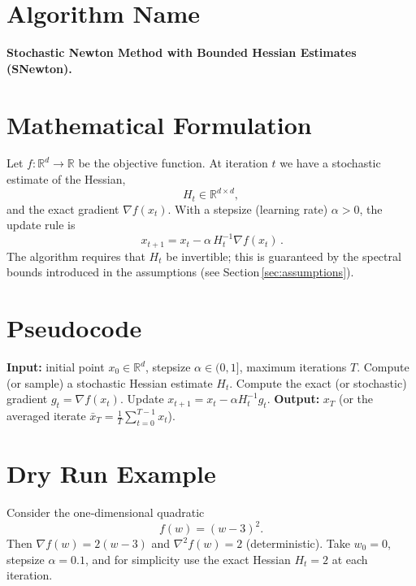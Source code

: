\documentclass{article}
\begin{document}
\section*{Algorithm Name}
\textbf{Stochastic Newton Method with Bounded Hessian Estimates (SNewton).}

\section*{Mathematical Formulation}
Let $f:\mathbb{R}^{d}\rightarrow\mathbb{R}$ be the objective function.  
At iteration $t$ we have a stochastic estimate of the Hessian,
\[
H_{t}\in\mathbb{R}^{d\times d},
\]
and the exact gradient $\nabla f(x_{t})$.  
With a stepsize (learning rate) $\alpha>0$, the update rule is
\begin{equation}
\boxed{\,x_{t+1}=x_{t}-\alpha\,H_{t}^{-1}\nabla f(x_{t})\,}. \tag{1}
\end{equation}
The algorithm requires that $H_{t}$ be invertible; this is guaranteed by the
spectral bounds introduced in the assumptions (see Section \ref{sec:assumptions}).

\section*{Pseudocode}
\begin{algorithm}[H]
\caption{Stochastic Newton (SNewton)}\label{alg:snewton}
\begin{algorithmic}[1]
\STATE \textbf{Input:} initial point $x_{0}\in\mathbb{R}^{d}$, stepsize $\alpha\in(0,1]$, 
maximum iterations $T$.
    \STATE Compute (or sample) a stochastic Hessian estimate $H_{t}$.
    \STATE Compute the exact (or stochastic) gradient $g_{t}=\nabla f(x_{t})$.
    \STATE Update $x_{t+1}=x_{t}-\alpha H_{t}^{-1}g_{t}$.
\ENDFOR
\STATE \textbf{Output:} $x_{T}$ (or the averaged iterate $\bar x_{T}=\frac1T\sum_{t=0}^{T-1}x_{t}$).
\end{algorithmic}
\end{algorithm}

\section*{Dry Run Example}
Consider the one‑dimensional quadratic
\[
f(w)=(w-3)^{2}.
\]
Then $\nabla f(w)=2(w-3)$ and $\nabla^{2}f(w)=2$ (deterministic).  
Take $w_{0}=0$, stepsize $\alpha=0.1$, and for simplicity use the exact Hessian
$H_{t}=2$ at each iteration.
\end{document}
